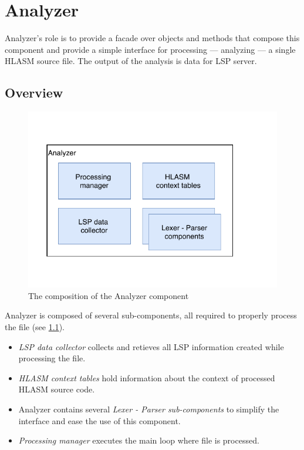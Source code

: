 \chapter {Analyzer}

Analyzer's role is to provide a facade over objects and methods that compose this component and provide a simple interface for processing --- analyzing --- a single HLASM source file. The output of the analysis is data for LSP server.

\section{Overview}

\begin{figure}
	\centering
	\includegraphics[width=\textwidth / 2]{img/analyzer_arch}
	\caption{The composition of the Analyzer component}
	\label{fig06:analyzer}
\end{figure}

Analyzer is composed of several sub-components, all required to properly process the file (see \cref{fig06:analyzer}). 
\begin{itemize}
	\item \emph{LSP data collector} collects and retieves all LSP information created while processing the file.
	\item \emph{HLASM context tables} hold information about the context of processed HLASM source code.
	\item Analyzer contains several \emph{Lexer - Parser sub-components} to simplify the interface and ease the use of this component.
	\item \emph{Processing manager} executes the main loop where file is processed.
\end{itemize}

